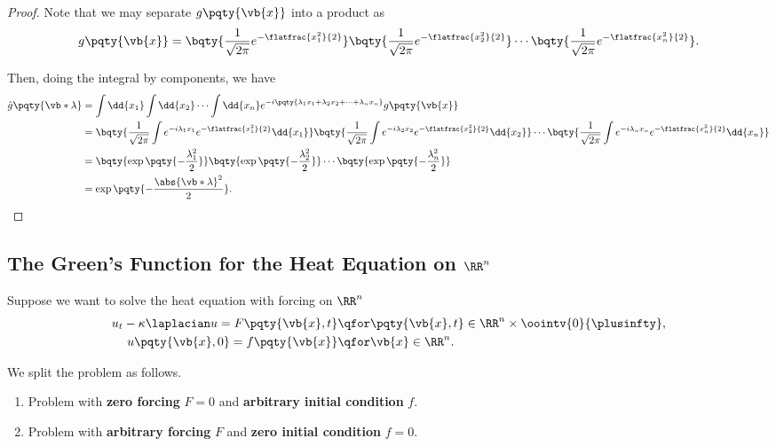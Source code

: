 \begin{proof}
    Note that we may separate \(g\pqty{\vb{x}}\) into a product as
    \begin{equation}
        g\pqty{\vb{x}} = \bqty{\frac{1}{\sqrt{2 \pi}} e^{- \flatfrac{x_1^2}{2}}} \bqty{\frac{1}{\sqrt{2 \pi}} e^{- \flatfrac{x_2^2}{2}}} \cdots \bqty{\frac{1}{\sqrt{2 \pi}} e^{- \flatfrac{x_n^2}{2}}}.
    \end{equation}

    Then, doing the integral by components, we have
    \begin{subequations}
        \begin{align}
            \hat{g}\pqty{\vb*{\lambda}} &= \int \dd{x_1} \int \dd{x_2} \cdots \int \dd{x_n} e^{- i \pqty{\lambda_1 x_1 + \lambda_2 x_2 + \cdots + \lambda_n x_n}} g\pqty{\vb{x}} \\
            &= \bqty{\frac{1}{\sqrt{2 \pi}} \int e^{- i \lambda_1 x_1} e^{- \flatfrac{x_1^2}{2}} \dd{x_1}} \bqty{\frac{1}{\sqrt{2 \pi}} \int e^{- i \lambda_2 x_2} e^{- \flatfrac{x_2^2}{2}} \dd{x_2}} \cdots \bqty{\frac{1}{\sqrt{2 \pi}} \int e^{- i \lambda_n x_n} e^{- \flatfrac{x_n^2}{2}} \dd{x_n}} \\
            &= \bqty{\exp\pqty{-\frac{\lambda_1^2}{2}}} \bqty{\exp\pqty{-\frac{\lambda_2^2}{2}}} \cdots \bqty{\exp\pqty{-\frac{\lambda_n^2}{2}}} \\
            &= \exp\pqty{- \frac{\abs{\vb*{\lambda}}^2}{2}}.
        \end{align}
    \end{subequations}
\end{proof}

\subsection{The Green's Function for the Heat Equation on \(\RR^n\)}

Suppose we want to solve the heat equation with forcing on \(\RR^n\)
\begin{subequations}
    \begin{align}
        u_t - \kappa \laplacian u = F\pqty{\vb{x}, t} &\qfor \pqty{\vb{x}, t} \in \RR^n \times \oointv{0}{\plusinfty}, \\
        u\pqty{\vb{x}, 0} = f\pqty{\vb{x}} &\qfor \vb{x} \in \RR^n.
    \end{align}
\end{subequations}

We split the problem as follows.
\begin{enumerate}[label=(\alph*)]
    \item Problem with \textbf{zero forcing} \(F = 0\) and \textbf{arbitrary initial condition} \(f\).
    \item Problem with \textbf{arbitrary forcing} \(F\) and \textbf{zero initial condition} \(f = 0\).
\end{enumerate}

